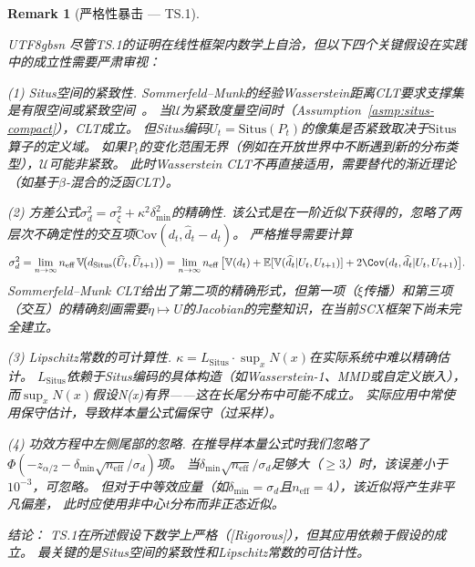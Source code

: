 \documentclass[12pt,a4paper]{article}
\newtheorem{remark}[theorem]{Remark}
\newcommand{\rigorous}{\textcolor{green!50!black}{\small\textsf{[Rigorous]}}}
\newcommand{\E}{\mathbb{E}}
\newcommand{\V}{\mathbb{V}}
\newcommand{\cU}{\mathcal{U}}
\newcommand{\Situs}{\mathrm{Situs}}
\begin{document}
\medskip\noindent
\begin{remark}[严格性暴击 --- TS.1]
\label{crit:ts1}
\begin{CJK}{UTF8}{gbsn}
尽管TS.1的证明在线性框架内数学上自洽，但以下四个关键假设在实践中的成立性需要严肃审视：

\emph{(1) Situs空间的紧致性.}
Sommerfeld--Munk的经验Wasserstein距离CLT要求支撑集是有限空间或紧致空间~\citep{sommerfeld2018inference}。
当$\cU$为紧致度量空间时（Assumption~\ref{asmp:situs-compact}），CLT成立。
但Situs编码$U_t = \Situs(P_t)$的像集是否紧致取决于$\Situs$算子的定义域。
如果$P_t$的变化范围无界（例如在开放世界中不断遇到新的分布类型），$\cU$可能非紧致。
此时Wasserstein CLT不再直接适用，需要替代的渐近理论（如基于$\beta$-混合的泛函CLT）。

\emph{(2) 方差公式$\sigma_d^2 = \sigma_\xi^2 + \kappa^2\delta_{\min}^2$的精确性.}
该公式是在一阶近似下获得的，忽略了两层次不确定性的交互项$\text{Cov}(d_t, \widehat{d}_t - d_t)$。
严格推导需要计算
\[
\sigma_d^2 = \lim_{n\to\infty} n_{\text{eff}}\,
\V\!\bigl(d_{\Situs}(\widehat{U}_t, \widehat{U}_{t+1})\bigr)
= \lim_{n\to\infty} n_{\text{eff}}\,
\bigl[\V(d_t) + \E[\V(\widehat{d}_t|U_t,U_{t+1})] + 2\Cov(d_t, \widehat{d}_t|U_t,U_{t+1})\bigr].
\]
Sommerfeld--Munk CLT给出了第二项的精确形式，但第一项（$\xi$传播）和第三项（交互）的精确刻画需要$\eta \mapsto U$的Jacobian的完整知识，在当前SCX框架下尚未完全建立。

\emph{(3) Lipschitz常数的可计算性.}
$\kappa = L_{\Situs} \cdot \sup_x N(x)$在实际系统中难以精确估计。
$L_{\Situs}$依赖于Situs编码的具体构造（如Wasserstein-1、MMD或自定义嵌入），
而$\sup_x N(x)$假设N(x)有界——这在长尾分布中可能不成立。
实际应用中常使用保守估计，导致样本量公式偏保守（过采样）。

\emph{(4) 功效方程中左侧尾部的忽略.}
在推导样本量公式时我们忽略了$\Phi(-z_{\alpha/2} - \delta_{\min}\sqrt{n_{\text{eff}}}/\sigma_d)$项。
当$\delta_{\min}\sqrt{n_{\text{eff}}}/\sigma_d$足够大（$\ge 3$）时，该误差小于$10^{-3}$，可忽略。
但对于中等效应量（如$\delta_{\min} = \sigma_d$且$n_{\text{eff}} = 4$），该近似将产生非平凡偏差，
此时应使用非中心t分布而非正态近似。

\emph{结论：} TS.1在所述假设下数学上严格（\rigorous），但其应用依赖于假设的成立。
最关键的是Situs空间的紧致性和Lipschitz常数的可估计性。
\end{CJK}
\end{remark}
\end{document}
